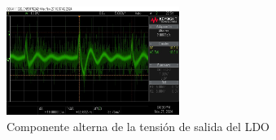 \begin{figure}[H]
    \centering
    \includegraphics[width=0.5\textwidth]{images/2-hardware/componentes/ldo/picosConLDO.jpg}
    \caption{Componente alterna de la tensión de salida del LDO}
    \label{fig:hardware/modulos/ldo-sin-picos}
\end{figure}